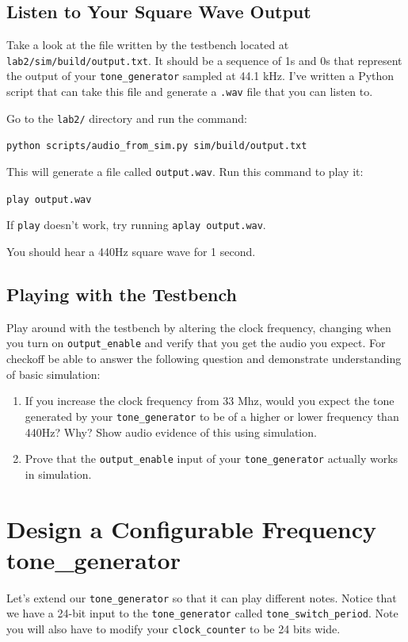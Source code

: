\documentclass[11pt]{article}
\begin{document}
\subsection{Listen to Your Square Wave Output}

Take a look at the file written by the testbench located at \verb|lab2/sim/build/output.txt|. It should be a sequence of 1s and 0s that represent the output of your \verb|tone_generator| sampled at 44.1 kHz. I've written a Python script that can take this file and generate a \verb|.wav| file that you can listen to.

Go to the \verb|lab2/| directory and run the command:

\verb|python scripts/audio_from_sim.py sim/build/output.txt|

This will generate a file called \verb|output.wav|. Run this command to play it:

\verb|play output.wav|

If \verb|play| doesn't work, try running \verb|aplay output.wav|.

You should hear a 440Hz square wave for 1 second.

\subsection{Playing with the Testbench}

Play around with the testbench by altering the clock frequency, changing when you turn on \verb|output_enable| and verify that you get the audio you expect. For checkoff be able to answer the following question and demonstrate understanding of basic simulation:

\begin{enumerate}
	\item If you increase the clock frequency from 33 Mhz, would you expect the tone generated by your \verb|tone_generator| to be of a higher or lower frequency than 440Hz? Why? Show audio evidence of this using simulation.
	\item Prove that the \verb|output_enable| input of your \verb|tone_generator| actually works in simulation.
\end{enumerate}

\section{Design a Configurable Frequency tone\_generator}

Let's extend our \verb|tone_generator| so that it can play different notes. Notice that we have a 24-bit input to the \verb|tone_generator| called \verb|tone_switch_period|. Note you will also have to modify your \verb|clock_counter| to be 24 bits wide.
\end{document}
